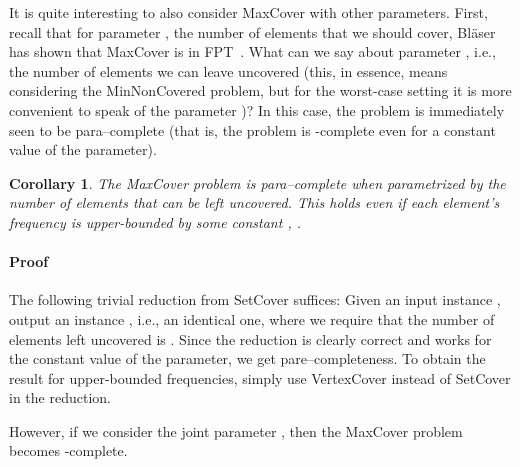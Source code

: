 \documentclass[11pt]{article}
\newtheorem{corollary}[theorem]{Corollary}
\newenvironment{proof}{\paragraph{Proof}}{\hfill\medskip}
\begin{document}
It is quite interesting to also consider MaxCover with other
parameters.  First, recall that for parameter , the number of
elements that we should cover, Bl{\"a}ser has shown that MaxCover is
in FPT~\cite{bla:j:partial-set-cover}.  What can we say about
parameter , i.e., the number of elements we can leave
uncovered (this, in essence, means considering the MinNonCovered
problem, but for the worst-case setting it is more convenient to speak
of the parameter )? In this case, the problem is immediately seen
to be para--complete (that is, the problem is -complete even
for a constant value of the parameter).

\begin{corollary}\label{cor:teqzero}
  The MaxCover problem is para--complete when parametrized by the
  number  of elements that can be left uncovered. This holds even
  if each element's frequency is upper-bounded by some constant ,
  .
\end{corollary}
\begin{proof}
  The following trivial reduction from SetCover suffices: Given an
  input instance , output an instance
  , i.e., an identical one, where we require that the
  number of elements left uncovered is . Since the reduction is
  clearly correct and works for the constant value of the parameter,
  we get pare--completeness. To obtain the result for upper-bounded frequencies,
  simply use VertexCover instead of SetCover in the reduction.
\end{proof}

However, if we consider the joint parameter , then the
MaxCover problem becomes -complete.
\end{document}
